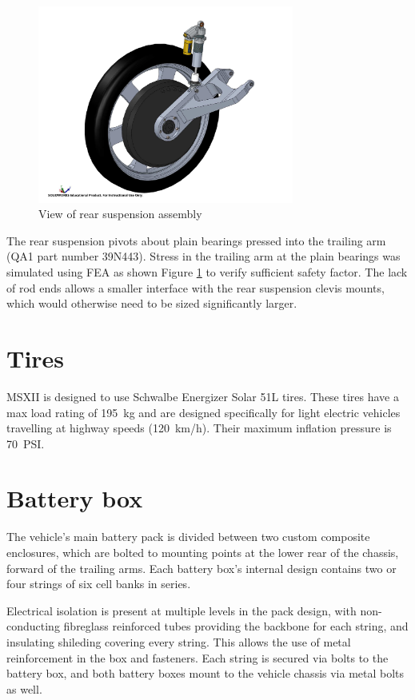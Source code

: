 \documentclass[10pt]{article}
\begin{document}
\begin{figure}
\centering
\includegraphics[width=0.75\textwidth]{figures/rear-suspension}
\caption{View of rear suspension assembly}
\label{fig:rear-suspension}
\end{figure}

The rear suspension pivots about plain bearings pressed into the trailing arm (QA1 part number 39N443). Stress in the trailing arm at the plain bearings was simulated using FEA as shown Figure \ref{fig:rear-suspension} to verify sufficient safety factor. The lack of rod ends allows a smaller interface with the rear suspension clevis mounts, which would otherwise need to be sized significantly larger.

\section{Tires}
MSXII is designed to use Schwalbe Energizer Solar 51L tires. These tires have a max load rating of \SI{195}{\kilo\gram} and are designed specifically for light electric vehicles travelling at highway speeds (\SI{120}{km/h}). Their maximum inflation pressure is \SI{70}{PSI}.

\section{Battery box}
The vehicle's main battery pack is divided between two custom composite enclosures, which are bolted to mounting points at the lower rear of the chassis, forward of the trailing arms. Each battery box's internal design contains two or four strings of six cell banks in series.

Electrical isolation is present at multiple levels in the pack design, with non-conducting fibreglass reinforced tubes providing the backbone for each string, and insulating shileding covering every string. This allows the use of metal reinforcement in the box and fasteners. Each string is secured via bolts to the battery box, and both battery boxes mount to the vehicle chassis via metal bolts as well.
\end{document}
